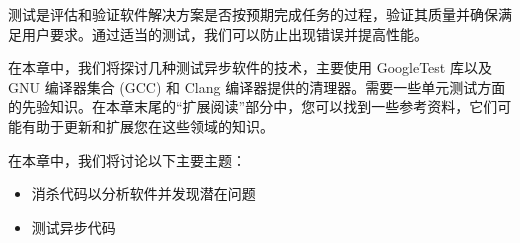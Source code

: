 测试是评估和验证软件解决方案是否按预期完成任务的过程，验证其质量并确保满足用户要求。通过适当的测试，我们可以防止出现错误并提高性能。

在本章中，我们将探讨几种测试异步软件的技术，主要使用 GoogleTest 库以及 GNU 编译器集合 (GCC) 和 Clang 编译器提供的清理器。需要一些单元测试方面的先验知识。在本章末尾的“扩展阅读”部分中，您可以找到一些参考资料，它们可能有助于更新和扩展您在这些领域的知识。

在本章中，我们将讨论以下主要主题：

\begin{itemize}
\item
消杀代码以分析软件并发现潜在问题

\item
测试异步代码
\end{itemize}